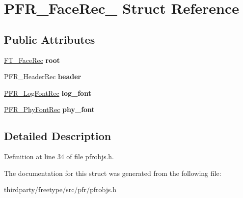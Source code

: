 \hypertarget{struct_p_f_r___face_rec__}{}\section{P\+F\+R\+\_\+\+Face\+Rec\+\_\+ Struct Reference}
\label{struct_p_f_r___face_rec__}
\subsection*{Public Attributes}
\begin{DoxyCompactItemize}
\item 
\mbox{\label{struct_p_f_r___face_rec___a6d0d14dcf2fe7d8e069918b41b84f162}} 
\hyperlink{struct_f_t___face_rec__}{F\+T\+\_\+\+Face\+Rec} {\bfseries root}
\item 
\mbox{\label{struct_p_f_r___face_rec___a9adc92717c73ac57d5cc12a931295747}} 
P\+F\+R\+\_\+\+Header\+Rec {\bfseries header}
\item 
\mbox{\label{struct_p_f_r___face_rec___a4ec2bb2cdcb623894cf3e7f909031fef}} 
\hyperlink{struct_p_f_r___log_font_rec__}{P\+F\+R\+\_\+\+Log\+Font\+Rec} {\bfseries log\+\_\+font}
\item 
\mbox{\label{struct_p_f_r___face_rec___af810dc7a2e86f4cf72a59659f1bf145c}} 
\hyperlink{struct_p_f_r___phy_font_rec__}{P\+F\+R\+\_\+\+Phy\+Font\+Rec} {\bfseries phy\+\_\+font}
\end{DoxyCompactItemize}


\subsection{Detailed Description}


Definition at line 34 of file pfrobjs.\+h.



The documentation for this struct was generated from the following file\+:\begin{DoxyCompactItemize}
\item 
thirdparty/freetype/src/pfr/pfrobjs.\+h\end{DoxyCompactItemize}
